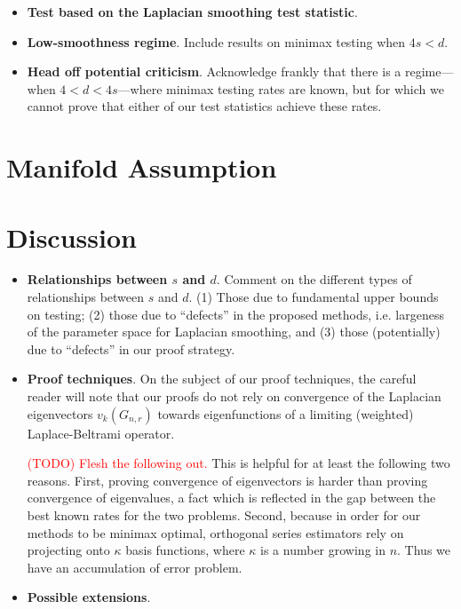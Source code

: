 \documentclass{article}
\newcommand{\1}{\mathbf{1}}
\theoremstyle{alden}
\theoremstyle{aldenthm}
\theoremstyle{definition}
\theoremstyle{remark}
\begin{document}
\begin{itemize}
	\item \textbf{Test based on the Laplacian smoothing test statistic}. 
	\item \textbf{Low-smoothness regime}. Include results on minimax testing when $4s < d$.
	\item \textbf{Head off potential criticism}. Acknowledge frankly that there is a regime---when $4 < d < 4s$---where minimax testing rates are known, but for which we cannot prove that either of our test statistics achieve these rates.
\end{itemize}

\section{Manifold Assumption}
\label{sec:manifold_assumption}


\section{Discussion}

\begin{itemize}
	\item \textbf{Relationships between $s$ and $d$}. Comment on the different types of relationships between $s$ and $d$. (1) Those due to fundamental upper bounds on testing; (2) those due to ``defects'' in the proposed methods, i.e. largeness of the parameter space for Laplacian smoothing, and (3) those (potentially) due to ``defects'' in our proof strategy.
	\item \textbf{Proof techniques}. On the subject of our proof techniques, the careful reader will note that our proofs do not rely on convergence of the Laplacian eigenvectors $v_k(G_{n,r})$ towards eigenfunctions of a limiting (weighted) Laplace-Beltrami operator.
	
	\textcolor{red}{(TODO) Flesh the following out.} This is helpful for at least the following two reasons. First, proving convergence of eigenvectors is harder than proving convergence of eigenvalues, a fact which is reflected in the gap between the best known rates for the two problems. Second, because in order for our methods to be minimax optimal, orthogonal series estimators rely on projecting onto $\kappa$ basis functions, where $\kappa$ is a number growing in $n$. Thus we have an accumulation of error problem.
	\item \textbf{Possible extensions}.
\end{itemize}
\end{document}
